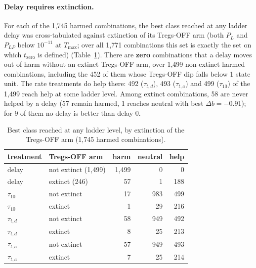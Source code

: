 \documentclass[11pt]{article}
\begin{document}
\paragraph{Delay requires extinction.}
For each of the 1,745 harmed combinations, the best class reached at any ladder
delay was cross-tabulated against extinction of its Tregs-OFF arm (both $P_L$ and
$P_{LP}$ below $10^{-11}$ at $T_{\max}$; over all 1,771 combinations this set is
exactly the set on which $t_{\mathrm{zero}}$ is defined) (Table~\ref{tab:harm_cross}). There are
\textbf{zero} combinations that a delay moves out of harm without an extinct
Tregs-OFF arm, over 1,499 non-extinct harmed combinations, including the 452 of
them whose Tregs-OFF dip falls below 1 state unit. The rate treatments do help
there: 492 ($\tau_{t,d}$), 493 ($\tau_{t,a}$) and 499 ($\tau_{10}$) of the 1,499
reach help at some ladder level. Among extinct combinations, 58 are never helped
by a delay (57 remain harmed, 1 reaches neutral with best $\Delta b=-0.91$); for
9 of them no delay is better than delay 0.

\begin{table}[H]
\centering
\caption{Best class reached at any ladder level, by extinction of the Tregs-OFF arm (1,745 harmed combinations).}
\label{tab:harm_cross}
\begin{tabular}{llrrr}
\toprule
treatment & Tregs-OFF arm & harm & neutral & help \\
\midrule
delay & not extinct (1,499) & 1{,}499 & 0 & 0 \\
delay & extinct (246) & 57 & 1 & 188 \\
$\tau_{10}$ & not extinct & 17 & 983 & 499 \\
$\tau_{10}$ & extinct & 1 & 29 & 216 \\
$\tau_{t,d}$ & not extinct & 58 & 949 & 492 \\
$\tau_{t,d}$ & extinct & 8 & 25 & 213 \\
$\tau_{t,a}$ & not extinct & 57 & 949 & 493 \\
$\tau_{t,a}$ & extinct & 7 & 25 & 214 \\
\bottomrule
\end{tabular}
\end{table}
\end{document}

